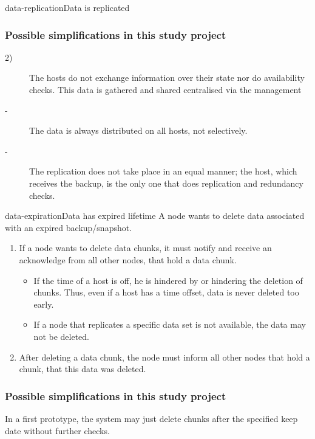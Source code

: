 \begin{scenario}{data-replication}{Data is replicated}
     \subsubsection{Possible simplifications in this study project}
     
     \begin{description}
	     \item[2)] The hosts do not exchange information over their state nor do availability checks. This data is gathered and shared centralised via the management
	     \item[-] The data is always distributed on all hosts, not selectively.
	     \item[-] The replication does not take place in an equal manner; the host, which receives the backup, is the only one that does replication and redundancy checks.
     \end{description}
\end{scenario}

\begin{scenario}{data-expiration}{Data has expired lifetime}
    A node wants to delete data associated with an expired backup/snapshot.
    
    \begin{enumerate}
	    \item If a node wants to delete data chunks, it must notify and receive an acknowledge from all other nodes, that hold a data chunk.
	    	\begin{itemize}
	    		\item If the time of a host is off, he is hindered by or hindering the deletion of chunks. Thus, even if a host has a time offset, data is never deleted too early.
	    		\item If a node that replicates a specific data set is not available, the data may not be deleted.
	    	\end{itemize}
	    \item After deleting a data chunk, the node must inform all other nodes that hold a chunk, that this data was deleted.
    \end{enumerate}
    
    
    \subsubsection{Possible simplifications in this study project}
   	In a first prototype, the system may just delete chunks after the specified keep date without further checks.
\end{scenario}


